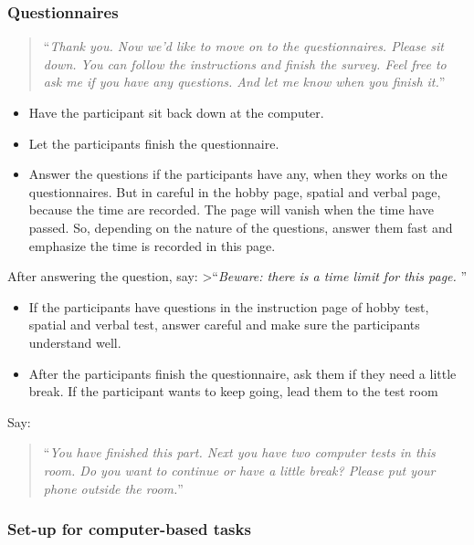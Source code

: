 \documentclass[]{article}
\providecommand{\tightlist}{%
  \setlength{\itemsep}{0pt}\setlength{\parskip}{0pt}}
\begin{document}
\subsubsection{Questionnaires}\label{questionnaires}

\begin{quote}
``\emph{Thank you. Now we'd like to move on to the questionnaires.
Please sit down. You can follow the instructions and finish the survey.
Feel free to ask me if you have any questions. And let me know when you
finish it.}''
\end{quote}

\begin{itemize}
\tightlist
\item
  Have the participant sit back down at the computer.
\item
  Let the participants finish the questionnaire.
\item
  Answer the questions if the participants have any, when they works on
  the questionnaires. But in careful in the hobby page, spatial and
  verbal page, because the time are recorded. The page will vanish when
  the time have passed. So, depending on the nature of the questions,
  answer them fast and emphasize the time is recorded in this page.
\end{itemize}

After answering the question, say: \textgreater{}``\emph{Beware: there
is a time limit for this page. }''

\begin{itemize}
\tightlist
\item
  If the participants have questions in the instruction page of hobby
  test, spatial and verbal test, answer careful and make sure the
  participants understand well.
\item
  After the participants finish the questionnaire, ask them if they need
  a little break. If the participant wants to keep going, lead them to
  the test room
\end{itemize}

Say:

\begin{quote}
``\emph{You have finished this part. Next you have two computer tests in
this room. Do you want to continue or have a little break? Please put
your phone outside the room.}''
\end{quote}

\subsubsection{Set-up for computer-based
tasks}\label{set-up-for-computer-based-tasks-1}
\end{document}
